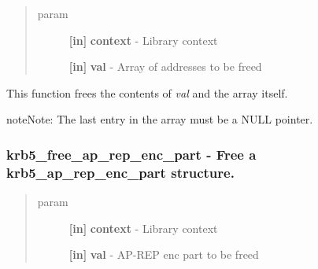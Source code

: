 \documentclass[letterpaper,10pt,english]{sphinxmanual}
\begin{document}
\begin{fulllineitems}
\label{appdev/refs/api/krb5_free_addresses:krb5_free_addresses}
\end{fulllineitems}

\begin{quote}\begin{description}
\item[{param}] \leavevmode
\textbf{{[}in{]}} \textbf{context} - Library context

\textbf{{[}in{]}} \textbf{val} - Array of addresses to be freed

\end{description}\end{quote}

This function frees the contents of \emph{val} and the array itself.

\begin{notice}{note}{Note:}
The last entry in the array must be a NULL pointer.
\end{notice}


\subsubsection{krb5\_free\_ap\_rep\_enc\_part -  Free a krb5\_ap\_rep\_enc\_part structure.}
\label{appdev/refs/api/krb5_free_ap_rep_enc_part:krb5-free-ap-rep-enc-part-free-a-krb5-ap-rep-enc-part-structure}\label{appdev/refs/api/krb5_free_ap_rep_enc_part::doc}

\begin{fulllineitems}
\label{appdev/refs/api/krb5_free_ap_rep_enc_part:krb5_free_ap_rep_enc_part}
\end{fulllineitems}

\begin{quote}\begin{description}
\item[{param}] \leavevmode
\textbf{{[}in{]}} \textbf{context} - Library context

\textbf{{[}in{]}} \textbf{val} - AP-REP enc part to be freed

\end{description}\end{quote}
\end{document}
